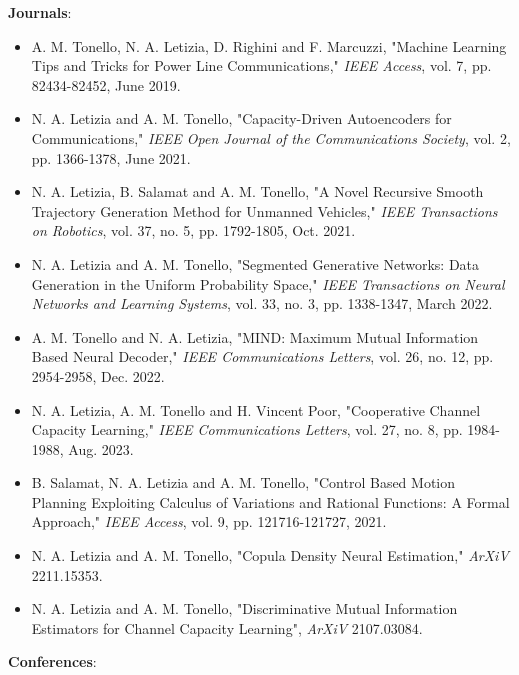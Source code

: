 \noindent \textbf{Journals}:
\begin{itemize}
	\item A. M. Tonello, N. A. Letizia, D. Righini and F. Marcuzzi, "Machine Learning Tips and Tricks for Power Line Communications," \textit{IEEE Access}, vol. 7, pp. 82434-82452, June 2019.
     \item N. A. Letizia and A. M. Tonello, "Capacity-Driven Autoencoders for Communications," \textit{IEEE Open Journal of the Communications Society}, vol. 2, pp. 1366-1378, June 2021.
    \item N. A. Letizia, B. Salamat and A. M. Tonello, "A Novel Recursive Smooth Trajectory Generation Method for Unmanned Vehicles," \textit{IEEE Transactions on Robotics}, vol. 37, no. 5, pp. 1792-1805, Oct. 2021.
    \item N. A. Letizia and A. M. Tonello, "Segmented Generative Networks: Data Generation in the Uniform Probability Space," \textit{IEEE Transactions on Neural Networks and Learning Systems}, vol. 33, no. 3, pp. 1338-1347, March 2022.
    \item A. M. Tonello and N. A. Letizia, "MIND: Maximum Mutual Information Based Neural Decoder," \textit{IEEE Communications Letters}, vol. 26, no. 12, pp. 2954-2958, Dec. 2022.
    \item N. A. Letizia, A. M. Tonello and H. Vincent Poor, "Cooperative Channel Capacity Learning," \textit{IEEE Communications Letters}, vol. 27, no. 8, pp. 1984-1988, Aug. 2023.
    \item B. Salamat, N. A. Letizia and A. M. Tonello, "Control Based Motion Planning Exploiting Calculus of Variations and Rational Functions: A Formal Approach," \textit{IEEE Access}, vol. 9, pp. 121716-121727, 2021.
    \item N. A. Letizia and A. M. Tonello, "Copula Density Neural Estimation," \textit{ArXiV} 2211.15353.
    \item N. A. Letizia and A. M. Tonello, "Discriminative Mutual Information Estimators for Channel Capacity Learning", \textit{ArXiV} 2107.03084.
\end{itemize}
\textbf{Conferences}:
